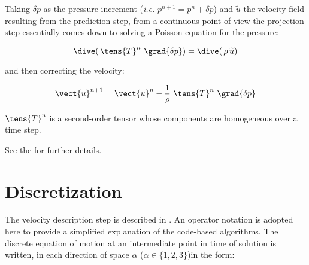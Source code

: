 Taking $\delta p$ as the pressure increment ({\it i.e.} $p^{n+1} = p^n+\delta p$) and $\widetilde{u}$ the velocity field resulting from the prediction step, from a continuous point of view the projection step essentially comes down to solving a Poisson equation for the pressure:

\begin{equation}
\dive(\,{\tens{T}^n\ \grad{\delta p}}) = \dive(\,{\rho \,\widetilde{u}})
\end{equation}

and then correcting the velocity:

\begin{equation}
\vect{u}^{n+1} = \vect{u}^n - \frac{1}{\rho}\ \tens{T}^n\ \grad{\delta p}
\end{equation}

$\tens{T}^n$ is a second-order tensor whose components are homogeneous over a time step.

See the  for further details.

\section*{Discretization}
The velocity description step is described in . An operator notation is adopted here to provide a simplified explanation of the code-based algorithms.
The discrete equation of motion at an intermediate point in time of solution is written, in each direction of space $\alpha$ ($\alpha \in \{1,2,3\}$)in the form:

